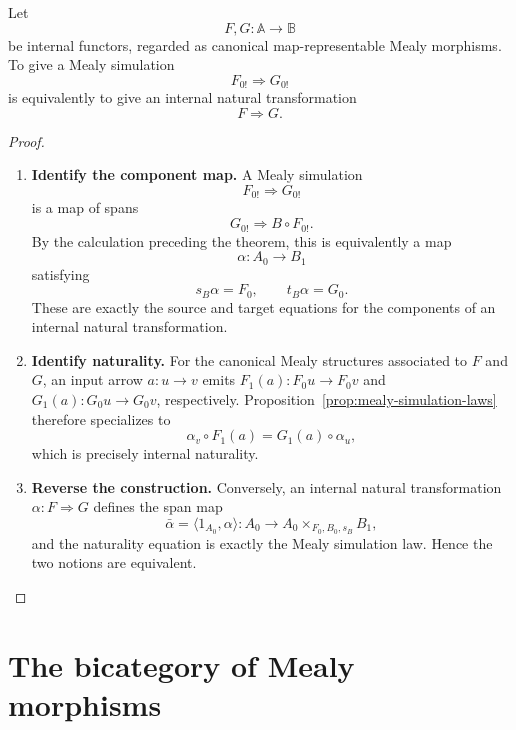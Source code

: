 \begin{theorem}
\label{thm:stateless-mealy-simulations-natural-transformations}
    Let
    \[
        F,G:\mathbb A\to\mathbb B
    \]
    be internal functors, regarded as canonical map-representable Mealy morphisms. To give a Mealy simulation
    \[
        F_{0!}\Rightarrow G_{0!}
    \]
    is equivalently to give an internal natural transformation
    \[
        F\Rightarrow G.
    \]
\end{theorem}
\begin{proof}
    \leavevmode
    \begin{enumerate}
        \item \textbf{Identify the component map.} A Mealy simulation
        \[
            F_{0!}\Rightarrow G_{0!}
        \]
        is a map of spans
        \[
            G_{0!}\Rightarrow B\circ F_{0!}.
        \]
        By the calculation preceding the theorem, this is equivalently a map
        \[
            \alpha:A_0\to B_1
        \]
        satisfying
        \[
            s_B\alpha=F_0,
            \qquad
            t_B\alpha=G_0.
        \]
        These are exactly the source and target equations for the components of an internal natural transformation.

        \item \textbf{Identify naturality.} For the canonical Mealy structures associated to \(F\) and \(G\), an input arrow \(a:u\to v\) emits \(F_1(a):F_0u\to F_0v\) and \(G_1(a):G_0u\to G_0v\), respectively. Proposition~\ref{prop:mealy-simulation-laws} therefore specializes to
        \[
            \alpha_v\circ F_1(a)
            =
            G_1(a)\circ\alpha_u,
        \]
        which is precisely internal naturality.

        \item \textbf{Reverse the construction.} Conversely, an internal natural transformation \(\alpha:F\Rightarrow G\) defines the span map
        \[
            \bar\alpha=\langle 1_{A_0},\alpha\rangle:
            A_0\to A_0\times_{F_0,B_0,s_B}B_1,
        \]
        and the naturality equation is exactly the Mealy simulation law. Hence the two notions are equivalent.
    \end{enumerate}
\end{proof}

\section{The bicategory of Mealy morphisms}
\label{sec:bicategory-of-mealy-morphisms}

